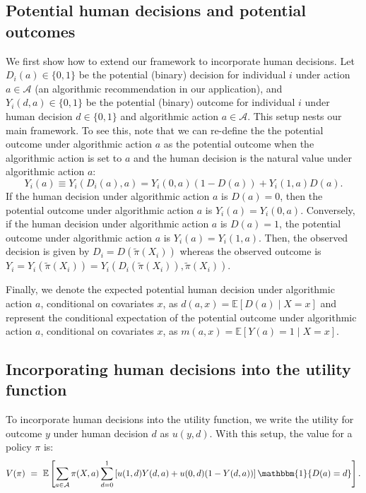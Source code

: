 \documentclass[12pt]{article}
\theoremstyle{definition}
\newcommand{\bbone}{\ensuremath{\mathbbm{1}}}
\newcommand{\E}{\ensuremath{\mathbb{E}}}
\newcommand{\<}{\langle}
\renewcommand{\>}{\rangle}
\newcommand\mcal[1]{\ensuremath{\mathcal{#1}}}
\begin{document}
\subsection{Potential human decisions and potential outcomes}
\label{sec:human_dec_setup}
We first show how to extend our framework to incorporate human decisions.
Let $D_i(a) \in \{0,1\}$ be the potential (binary) decision for
individual $i$ under action $a \in \mcal{A}$ (an algorithmic
recommendation in our application), and $Y_i(d, a) \in \{0, 1\}$ be
the potential (binary) outcome for individual $i$ under human decision
$d \in \{0, 1\}$ and algorithmic action $a \in \mcal{A}$.
This setup nests our main framework. To see this, note that we can re-define the
the potential outcome under algorithmic action $a$ as the potential outcome
when the algorithmic action is set to $a$ and the human decision is the natural
value under algorithmic action $a$:
\[
  Y_i(a) \equiv Y_i(D_i(a), a) = Y_i(0, a) (1 - D(a)) + Y_i(1, a) D(a).
\]
If the human decision under algorithmic action $a$ is $D(a) = 0$,
then the potential outcome under algorithmic action $a$ is $Y_i(a) = Y_i(0, a)$.
Conversely, if the human decision under algorithmic action $a$ is $D(a) = 1$,
the potential outcome under algorithmic action $a$ is $Y_i(a) = Y_i(1,a)$.
Then, the observed decision is
given by $D_i = D(\tilde{\pi}(X_i))$ whereas the observed outcome is
$Y_i = Y_i(\tilde{\pi}(X_i)) = Y_i(D_i(\tilde{\pi}(X_i)),
\tilde{\pi}(X_i))$.


Finally, we denote the expected
potential human decision under algorithmic action $a$,
conditional on covariates $x$, as
$d(a, x) = \E[D(a) \mid X = x]$ and represent the conditional expectation
of the potential outcome under algorithmic action $a$, conditional on covariates
$x$, as $m(a,x) = \E[Y(a) = 1 \mid X = x]$.

\subsection{Incorporating human decisions into the utility function}


To incorporate human decisions into the utility function, we write
the utility for outcome $y$
under human decision $d$ as $u(y,d)$.  With this setup, the value for a
policy $\pi$ is:
\begin{equation*}
  V(\pi) \ = \ \E\left[\sum_{a \in \mcal{A}} \pi(X, a) \sum_{d = 0}^1 \left[u(1, d) Y(d, a)  + u(0, d)(1 - Y(d,a))\right]\bbone\{D(a) = d\}\right].
\end{equation*}
\end{document}
